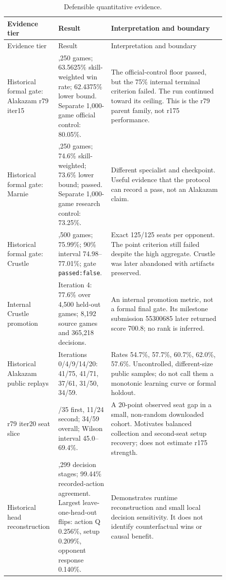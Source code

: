 \documentclass[10pt]{article}
\begin{document}
\small
\begin{longtable}{>{\raggedright\arraybackslash}p{0.17\linewidth}>{\raggedright\arraybackslash}p{0.22\linewidth}>{\raggedright\arraybackslash}p{0.50\linewidth}}
\caption{Defensible quantitative evidence.}\label{tab:results}\\
\toprule
Evidence tier & Result & Interpretation and boundary \\
\midrule
\endfirsthead
\toprule
Evidence tier & Result & Interpretation and boundary \\
\midrule
\endhead
Historical formal gate: Alakazam r79 iter15 & 4,250 games; 63.5625\% skill-weighted win rate; 62.4375\% lower bound. Separate 1,000-game official control: 80.05\%. & The official-control floor passed, but the 75\% internal terminal criterion failed. The run continued toward its ceiling. This is the r79 parent family, not r175 performance. \\
Historical formal gate: Marnie & 4,250 games; 74.6\% skill-weighted; 73.6\% lower bound; passed. Separate 1,000-game research control: 73.25\%. & Different specialist and checkpoint. Useful evidence that the protocol can record a pass, not an Alakazam claim. \\
Historical formal gate: Crustle & 4,500 games; 75.99\%; 90\% interval 74.98--77.01\%; gate \texttt{passed:false}. & Exact 125/125 seats per opponent. The point criterion still failed despite the high aggregate. Crustle was later abandoned with artifacts preserved. \\
Internal Crustle promotion & Iteration 4: 77.6\% over 4,500 held-out games; 8,192 source games and 365,218 decisions. & An internal promotion metric, not a formal final gate. Its milestone submission 55300685 later returned score 700.8; no rank is inferred. \\
Historical Alakazam public replays & Iterations 0/4/9/14/20: 41/75, 41/71, 37/61, 31/50, 34/59. & Rates 54.7\%, 57.7\%, 60.7\%, 62.0\%, 57.6\%. Uncontrolled, different-size public samples; do not call them a monotonic learning curve or formal holdout. \\
r79 iter20 seat slice & 23/35 first, 11/24 second; 34/59 overall; Wilson interval 45.0--69.4\%. & A 20-point observed seat gap in a small, non-random downloaded cohort. Motivates balanced collection and second-seat setup recovery; does not estimate r175 strength. \\
Historical head reconstruction & 4,299 decision stages; 99.44\% recorded-action agreement. Largest leave-one-head-out flips: action Q 0.256\%, setup 0.209\%, opponent response 0.140\%. & Demonstrates runtime reconstruction and small local decision sensitivity. It does not identify counterfactual wins or causal benefit. \\

\end{longtable}
\end{document}
